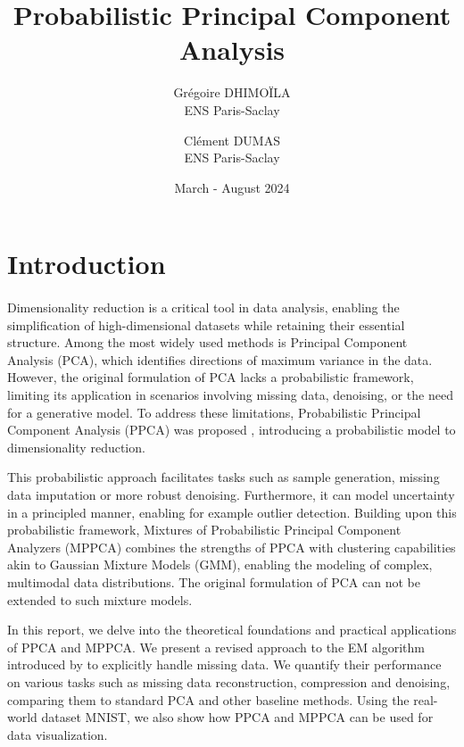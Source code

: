 \documentclass{article}
\begin{document}
\title{Probabilistic Principal Component Analysis}
\author{Grégoire DHIMOÏLA \\ ENS Paris-Saclay \and Clément DUMAS \\ ENS Paris-Saclay}
\date{March - August 2024}
\maketitle

\section{Introduction}
\label{sec:introduction}

\paragraph{} Dimensionality reduction is a critical tool in data analysis, enabling the simplification of high-dimensional datasets while retaining their essential structure. Among the most widely used methods is Principal Component Analysis (PCA), which identifies directions of maximum variance in the data. However, the original formulation of PCA lacks a probabilistic framework, limiting its application in scenarios involving missing data, denoising, or the need for a generative model. To address these limitations, Probabilistic Principal Component Analysis (PPCA) was proposed \citep{PPCA}, introducing a probabilistic model to dimensionality reduction.

This probabilistic approach facilitates tasks such as sample generation, missing data imputation or more robust denoising. Furthermore, it can model uncertainty in a principled manner, enabling for example outlier detection. Building upon this probabilistic framework, Mixtures of Probabilistic Principal Component Analyzers (MPPCA) \citep{MPPCA} combines the strengths of PPCA with clustering capabilities akin to Gaussian Mixture Models (GMM), enabling the modeling of complex, multimodal data distributions. The original formulation of PCA can not be extended to such mixture models.

In this report, we delve into the theoretical foundations and practical applications of PPCA and MPPCA. We present a revised approach to the EM algorithm introduced by \citet{PPCA} to explicitly handle missing data. We quantify their performance on various tasks such as missing data reconstruction, compression and denoising, comparing them to standard PCA and other baseline methods. Using the real-world dataset MNIST, we also show how PPCA and MPPCA can be used for data visualization.
\end{document}
